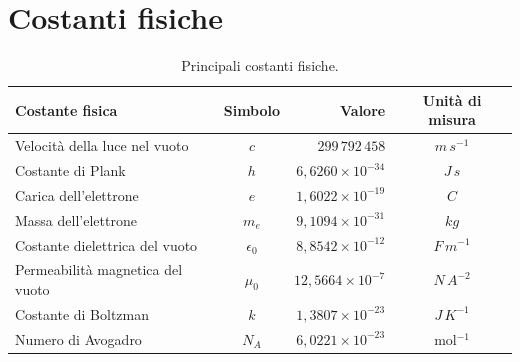 \documentclass[a4paper,12pt,titlepage,openany]{book}
\theoremstyle{mydef}
\begin{document}
    \chapter{Costanti fisiche}
        \begin{table}[h]
            \caption{Principali costanti fisiche.}
            \centering
            \begin{tabular}{lcrc}
                \toprule
                Costante fisica & Simbolo & Valore & Unità di misura\\
                \midrule
                Velocità della luce nel vuoto & $c$ & $299\,792\,458$ & $m\,s^{-1}$\\
                Costante di Plank & $h$ & $6,6260\times 10^{-34}$ & $J\,s$\\
                Carica dell'elettrone & $e$ & $1,6022\times 10^{-19}$ & $C$\\
                Massa dell'elettrone & $m_e$ & $9,1094\times 10^{-31}$ & $kg$\\
                Costante dielettrica del vuoto & $\epsilon_0$ & $8,8542\times 10^{-12}$ & $F\,m^{-1}$\\
                Permeabilità magnetica del vuoto & $\mu_0$ & $12,5664\times 10^{-7}$ & $N\,A^{-2}$\\
                Costante di Boltzman & $k$ & $1,3807\times 10^{-23}$ & $J\,K^{-1}$\\
                Numero di Avogadro & $N_A$ & $6,0221\times 10^{-23}$ & mol$^{-1}$\\
                \bottomrule
            \end{tabular}
        \end{table}
    
\end{document}

